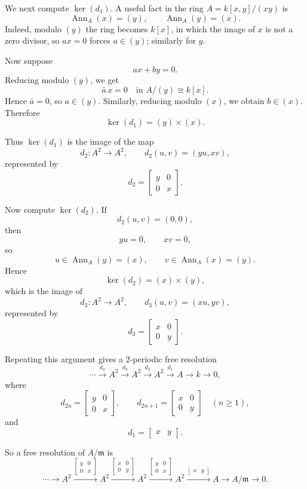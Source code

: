\documentclass[12pt,a4paper]{article}
\theoremstyle{plain}
\theoremstyle{definition}      %
\begin{document}
We next compute \(\ker(d_1)\). A useful fact in the ring \(A=k[x,y]/(xy)\) is
\[
\operatorname{Ann}_A(x)=(y),
\qquad
\operatorname{Ann}_A(y)=(x).
\]
Indeed, modulo \((y)\) the ring becomes \(k[x]\), in which the image of \(x\) is not a zero divisor, so \(ax=0\) forces \(a\in (y)\); similarly for \(y\).

Now suppose
\[
ax+by=0.
\]
Reducing modulo \((y)\), we get
\[
\bar a\,x=0 \quad\text{in } A/(y)\cong k[x].
\]
Hence \(\bar a=0\), so \(a\in (y)\). Similarly, reducing modulo \((x)\), we obtain \(b\in (x)\). Therefore
\[
\ker(d_1)=(y)\times (x).
\]

Thus \(\ker(d_1)\) is the image of the map
\[
d_2:A^2\to A^2,
\qquad
d_2(u,v)=(yu,xv),
\]
represented by
\[
d_2=
\begin{bmatrix}
	y&0\\
	0&x
\end{bmatrix}.
\]

Now compute \(\ker(d_2)\). If
\[
d_2(u,v)=(0,0),
\]
then
\[
yu=0,\qquad xv=0,
\]
so
\[
u\in \operatorname{Ann}_A(y)=(x),
\qquad
v\in \operatorname{Ann}_A(x)=(y).
\]
Hence
\[
\ker(d_2)=(x)\times (y),
\]
which is the image of
\[
d_3:A^2\to A^2,
\qquad
d_3(u,v)=(xu,yv),
\]
represented by
\[
d_3=
\begin{bmatrix}
	x&0\\
	0&y
\end{bmatrix}.
\]

Repeating this argument gives a \(2\)-periodic free resolution
\[
\cdots \xrightarrow{d_4} A^2 \xrightarrow{d_3} A^2 \xrightarrow{d_2} A^2 \xrightarrow{d_1} A \to k \to 0,
\]
where
\[
d_{2n}=
\begin{bmatrix}
	y&0\\
	0&x
\end{bmatrix},
\qquad
d_{2n+1}=
\begin{bmatrix}
	x&0\\
	0&y
\end{bmatrix}
\quad (n\ge 1),
\]
and
\[
d_1=\begin{bmatrix}x&y\end{bmatrix}.
\]

So a free resolution of \(A/\mathfrak m\) is
\[
\cdots \to A^2
\xrightarrow{\left[\begin{smallmatrix}y&0\\0&x\end{smallmatrix}\right]}
A^2
\xrightarrow{\left[\begin{smallmatrix}x&0\\0&y\end{smallmatrix}\right]}
A^2
\xrightarrow{\left[\begin{smallmatrix}y&0\\0&x\end{smallmatrix}\right]}
A^2
\xrightarrow{\left[\begin{smallmatrix}x&y\end{smallmatrix}\right]}
A
\to A/\mathfrak m \to 0.
\]
\end{document}
